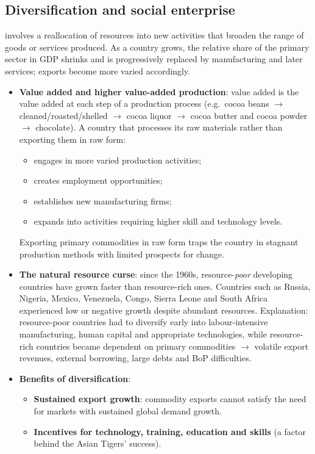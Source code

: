 \subsection{Diversification and social enterprise}
 involves a reallocation of resources into new activities that broaden the range of goods or services produced. As a country grows, the relative share of the primary sector in GDP shrinks and is progressively replaced by manufacturing and later services; exports become more varied accordingly.
\begin{itemize}
  \item \textbf{Value added and higher value-added production}: value added is the value added at each step of a production process (e.g.\ cocoa beans $\to$ cleaned/roasted/shelled $\to$ cocoa liquor $\to$ cocoa butter and cocoa powder $\to$ chocolate). A country that processes its raw materials rather than exporting them in raw form:
  \begin{itemize}
    \item engages in more varied production activities;
    \item creates employment opportunities;
    \item establishes new manufacturing firms;
    \item expands into activities requiring higher skill and technology levels.
  \end{itemize}
  Exporting primary commodities in raw form traps the country in stagnant production methods with limited prospects for change.
  \item \textbf{The natural resource curse}: since the 1960s, resource-\textit{poor} developing countries have grown faster than resource-rich ones. Countries such as Russia, Nigeria, Mexico, Venezuela, Congo, Sierra Leone and South Africa experienced low or negative growth despite abundant resources. Explanation: resource-poor countries had to diversify early into labour-intensive manufacturing, human capital and appropriate technologies, while resource-rich countries became dependent on primary commodities $\to$ volatile export revenues, external borrowing, large debts and BoP difficulties.
  \item \textbf{Benefits of diversification}:
  \begin{itemize}
    \item \textbf{Sustained export growth}: commodity exports cannot satisfy the need for markets with sustained global demand growth.
    \item \textbf{Incentives for technology, training, education and skills} (a factor behind the Asian Tigers' success).

\end{itemize}
\end{itemize}
